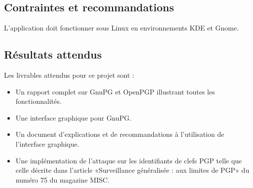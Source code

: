 \documentclass{../res/univ-projet}
\begin{document}
\subsection{Contraintes et recommandations}

L'application doit fonctionner sous Linux en environnements KDE et Gnome.

\subsection{Résultats attendus}
Les livrables attendus pour ce projet sont :
\begin{itemize}
 \item Un rapport complet sur GnuPG et OpenPGP illustrant toutes les fonctionnalités.
 \item Une interface graphique pour GnuPG.
 \item Un document d'explications et de recommandations à l'utilisation de l'interface graphique.
 \item Une implémentation de l'attaque sur les identifiants de clefs PGP telle que celle décrite dans l'article «Surveillance généralisée : aux limites de PGP» du numéro 75 du magazine MISC.
\end{itemize}
\end{document}
